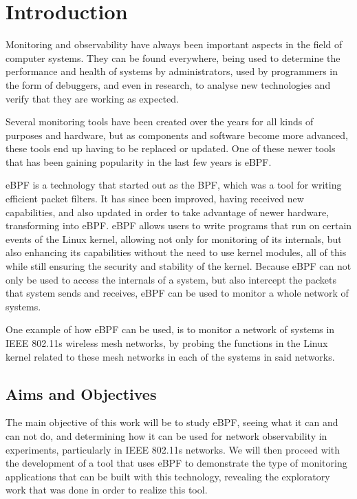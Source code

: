 \chapter{Introduction}\label{chap:intro}

Monitoring and observability have always been important aspects in the field of
computer systems. They can be found everywhere, being used to determine the
performance and health of systems by administrators, used by programmers in the
form of debuggers, and even in research, to analyse new technologies and verify
that they are working as expected.

Several monitoring tools have been created over the years for all kinds of
purposes and hardware, but as components and software become more advanced,
these tools end up having to be replaced or updated. One of these newer tools
that has been gaining popularity in the last few years is eBPF.

eBPF is a technology that started out as the \ac{BPF}, which was a tool for
writing efficient packet filters. It has since been improved, having received
new capabilities, and also updated in order to take advantage of newer hardware,
transforming into eBPF. eBPF allows users to write programs that run on certain
events of the Linux kernel, allowing not only for monitoring of its internals,
but also enhancing its capabilities without the need to use kernel modules, all
of this while still ensuring the security and stability of the kernel. Because
eBPF can not only be used to access the internals of a system, but also
intercept the packets that system sends and receives, eBPF can be used to
monitor a whole network of systems.

One example of how eBPF can be used, is to monitor a network of systems in
\ac{IEEE} 802.11s wireless mesh networks, by probing the functions in the Linux
kernel related to these mesh networks in each of the systems in said networks.


\section{Aims and Objectives}

The main objective of this work will be to study eBPF, seeing what it can and
can not do, and determining how it can be used for network observability in
experiments, particularly in \ac{IEEE} 802.11s networks. We will then proceed
with the development of a tool that uses eBPF to demonstrate the type of
monitoring applications that can be built with this technology, revealing the
exploratory work that was done in order to realize this tool.


